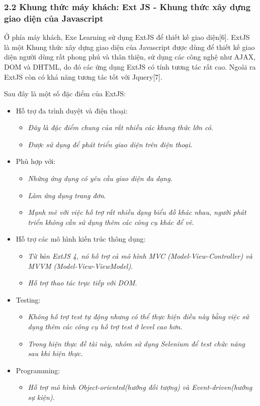 \subsubsection{2.2 Khung thức máy khách: Ext JS - Khung thức xây dựng giao diện của Javascript}
Ở phía máy khách, Exe Learning sử dụng ExtJS để thiết kế giao diện[6]. ExtJS là một Khung thức xây dựng giao diện của Javascript được dùng để thiết kế giao diện người dùng rất phong phú và thân thiện, sử dụng các công nghệ như AJAX, DOM và DHTML, do đó các ứng dụng ExtJS có tính tương tác rất cao. Ngoài ra ExtJS còn có khả năng tương tác tốt với Jquery[7]. 

Sau đây là một số đặc điểm của ExtJS:

\begin{itemize}
	
	\item Hỗ trợ đa trình duyệt và điện thoại:
	\begin{itemize}
		\item \textit{Đây là đặc điểm chung của rất nhiều các khung thức lớn có}.
		\item \textit{Được sử dụng để phát triển giao diện trên điện thoại}.
	\end{itemize}
	
	\item Phù hợp với:
	\begin{itemize}
		\item \textit{Những ứng dụng có yêu cầu giao diện đa dạng}.
		\item \textit{Làm ứng dụng trang đơn}.
		\item \textit{Mạnh mẽ với việc hỗ trợ rất nhiều dạng biểu đồ khác nhau, người phát triển không cần sử dụng thêm các công cụ khác để vẽ}.
	\end{itemize}
	
	
	\item Hỗ trợ các mô hình kiến trúc thông dụng:
	\begin{itemize}
		\item \textit{Từ bản ExtJS 4, nó hỗ trợ cả mô hình MVC (Model-View-Controller) và MVVM (Model-View-ViewModel)}.
		\item \textit{Hỗ trợ thao tác trực tiếp với DOM}.
	\end{itemize}
	
	\item Testing:
	\begin{itemize}
		\item \textit{Không hỗ trợ test tự động nhưng có thể thực hiện điều này bằng việc sử dụng thêm các công cụ hỗ trợ test ở level cao hơn}.
		\item \textit{Trong hiện thực đề tài này, nhóm sử dụng Selenium để test chức năng sau khi hiện thực}.
	\end{itemize}
	
	\item Programming:
	\begin{itemize}
		\item \textit{Hỗ trợ mô hình Object-oriented(hướng đối tượng) và Event-driven(hướng sự kiện)}.
	\end{itemize}
	
\end{itemize}

